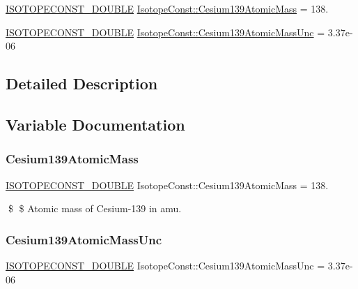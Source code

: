 \begin{DoxyCompactItemize}
\item 
\mbox{\hyperlink{group___isotope_const-_macros_ga8f45a7272ce02c0b4c65c44636ed719a}{I\+S\+O\+T\+O\+P\+E\+C\+O\+N\+S\+T\+\_\+\+D\+O\+U\+B\+LE}} \mbox{\hyperlink{group___isotope_const-_cesium-_cs139_ga7828d279005a23faecfdb1cd67dae0c2}{Isotope\+Const\+::\+Cesium139\+Atomic\+Mass}} = 138.
\item 
\mbox{\hyperlink{group___isotope_const-_macros_ga8f45a7272ce02c0b4c65c44636ed719a}{I\+S\+O\+T\+O\+P\+E\+C\+O\+N\+S\+T\+\_\+\+D\+O\+U\+B\+LE}} \mbox{\hyperlink{group___isotope_const-_cesium-_cs139_gac7fc721ac1bcc66a8d6fd784c7466821}{Isotope\+Const\+::\+Cesium139\+Atomic\+Mass\+Unc}} = 3.\+37e-\/06
\end{DoxyCompactItemize}


\subsection{Detailed Description}


\subsection{Variable Documentation}
\mbox{\label{group___isotope_const-_cesium-_cs139_ga7828d279005a23faecfdb1cd67dae0c2}} 
\subsubsection{\texorpdfstring{Cesium139\+Atomic\+Mass}{Cesium139AtomicMass}}
{\footnotesize\ttfamily \mbox{\hyperlink{group___isotope_const-_macros_ga8f45a7272ce02c0b4c65c44636ed719a}{I\+S\+O\+T\+O\+P\+E\+C\+O\+N\+S\+T\+\_\+\+D\+O\+U\+B\+LE}} Isotope\+Const\+::\+Cesium139\+Atomic\+Mass = 138.}

\$ \$ Atomic mass of Cesium-\/139 in amu. \mbox{\label{group___isotope_const-_cesium-_cs139_gac7fc721ac1bcc66a8d6fd784c7466821}} 
\subsubsection{\texorpdfstring{Cesium139\+Atomic\+Mass\+Unc}{Cesium139AtomicMassUnc}}
{\footnotesize\ttfamily \mbox{\hyperlink{group___isotope_const-_macros_ga8f45a7272ce02c0b4c65c44636ed719a}{I\+S\+O\+T\+O\+P\+E\+C\+O\+N\+S\+T\+\_\+\+D\+O\+U\+B\+LE}} Isotope\+Const\+::\+Cesium139\+Atomic\+Mass\+Unc = 3.\+37e-\/06}

